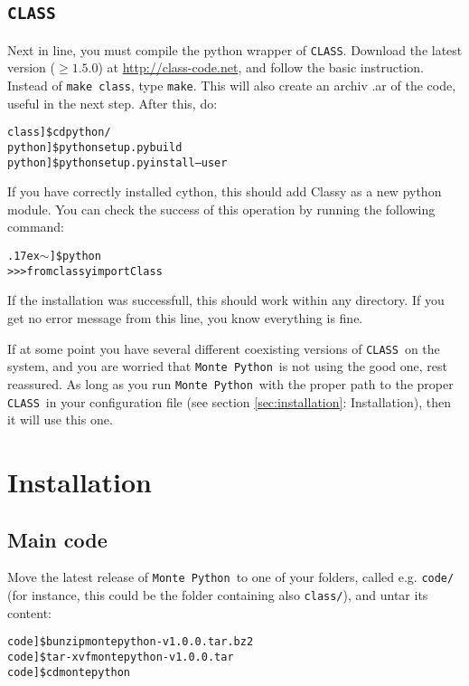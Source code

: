 \documentclass[10pt]{article}
\newcommand{\CLASS}{\texttt{CLASS}}
\newcommand{\MP}{\texttt{Monte Python}}
\newcommand{\tild}{\raise.17ex\hbox{$\scriptstyle\mathtt{\sim}$}}
\begin{document}
  \subsection{\CLASS}

  Next in line, you must compile the python wrapper of \CLASS. Download the
  latest version ($\geq 1.5.0$) at \url{http://class-code.net}, and follow the basic
  instruction. Instead of  \verb?make class?, type \verb?make?. This will
  also create an archiv .ar of the code, useful in the next step. After this, do:

  \begin{alltt}
   class]\$ cd python/
   python]\$ python setup.py build
   python]\$ python setup.py install --user
  \end{alltt}

  If you have correctly installed cython, this should add Classy as a new python
  module. You can check the success of this operation by running the following
  command:

  \begin{alltt}
    \tild]\$ python
    >>> from classy import Class
  \end{alltt}

If the installation was successfull, this should work within any directory. If you get no error message from this line, you know everything is fine.

  If at some point you have several different coexisting versions of \CLASS~on the system, and you are worried that \MP~is not using the good one, rest
  reassured. As long as you run \MP~with the proper path to the proper \CLASS~in your configuration file (see section \ref{sec:installation}: Installation),
  then it will use this one.
  
\section{Installation\label{sec:installation}}

\subsection{Main code}

  Move the latest release of \MP~to one of your folders, called e.g. \verb?code/? (for instance, this could be the folder containing also \verb?class/?), and untar its
  content:

  \begin{alltt} 
    code]\$ bunzip montepython-v1.0.0.tar.bz2 
    code]\$ tar -xvf montepython-v1.0.0.tar
    code]\$ cd montepython
  \end{alltt}
\end{document}
